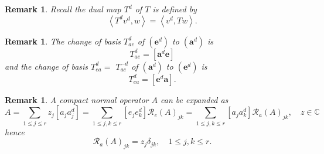 \documentclass[aps,preprint]{revtex4}%
\newtheorem{remark}[theorem]{Remark}
\begin{document}
\begin{remark}
Recall the dual map $T^{d}$ of $T$ is defined by
\begin{equation}
\left\langle T^{d}v^{d},w\right\rangle =\left\langle v^{d},Tw\right\rangle .
\end{equation}

\end{remark}

\begin{remark}
The change of basis $T_{ae}^{d}$ of $\left(  \mathbf{e}^{d}\right)  $ to
$\left(  \mathbf{a}^{d}\right)  $ is
\begin{equation}
T_{ae}^{d}=\left[  \mathbf{a}^{d}\mathbf{e}\right]
\end{equation}
and the change of basis $T_{ea}^{d}=$ $T_{ae}^{-d}$ of $\left(  \mathbf{a}%
^{d}\right)  $ to $\left(  \mathbf{e}^{d}\right)  $ is
\begin{equation}
T_{ea}^{d}=\left[  \mathbf{e}^{d}\mathbf{a}\right]  .
\end{equation}

\end{remark}

\begin{remark}
A compact normal operator $A$ can be expanded as
\begin{equation}
A=\sum_{1\leq j\leq r}z_{j}\left[  a_{j}a_{j}^{d}\right]  =\sum_{1\leq j,k\leq
r}\left[  e_{j}e_{k}^{d}\right]  \mathcal{R}_{e}\left(  A\right)  _{jk}%
=\sum_{1\leq j,k\leq r}\left[  a_{j}a_{k}^{d}\right]  \mathcal{R}_{a}\left(
A\right)  _{jk},\quad z\in\mathbb{C}%
\end{equation}
hence
\begin{equation}
\mathcal{R}_{a}\left(  A\right)  _{jk}=z_{j}\delta_{jk},\quad1\leq j,k\leq r.
\end{equation}

\end{remark}
\end{document}
